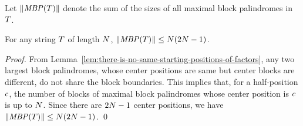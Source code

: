 Let $\|\mathit{MBP}(T)\|$ denote the sum of the sizes of all maximal block palindromes in $T$.
\begin{lemma}
  \label{lem:size-maximal-block-palindrome}
  For any string $T$ of length $N$, $\|\mathit{MBP}(T)\| \le N(2N-1)$.
\end{lemma}
\begin{proof}
  From Lemma~\ref{lem:there-is-no-same-starting-positions-of-factors}, any two largest block palindromes, whose center positions
  are same but center blocks are different, do not share the block boundaries.
  This implies that, for a half-position $c$, the number of blocks of maximal block palindromes whose center position is $c$ is up to $N$.
  Since there are $2N-1$ center positions, we have $\|\mathit{MBP}(T)\| \le N(2N-1)$.
	\qed
\end{proof}
